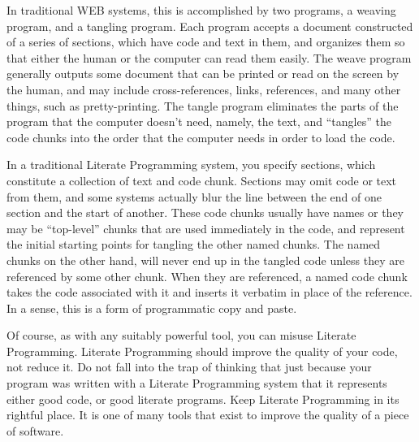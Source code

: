 In traditional WEB systems, this is accomplished by two programs, a
weaving program, and a tangling program.  Each program accepts a
document constructed of a series of sections, which have code and text
in them, and organizes them so that either the human or the computer
can read them easily.  The weave program generally outputs some
document that can be printed or read on the screen by the human, and
may include cross-references, links, references, and many other
things, such as pretty-printing.  The tangle program eliminates the
parts of the program that the computer doesn't need, namely, the text,
and ``tangles'' the code chunks into the order that the computer needs
in order to load the code.

In a traditional Literate Programming system, you specify sections,
which constitute a collection of text and code chunk.  Sections may
omit code or text from them, and some systems actually blur the line
between the end of one section and the start of another.  These code
chunks usually have names or they may be ``top-level'' chunks that are
used immediately in the code, and represent the initial starting
points for tangling the other named chunks.  The named chunks on the
other hand, will never end up in the tangled code unless they are
referenced by some other chunk.  When they are referenced, a named
code chunk takes the code associated with it and inserts it verbatim
in place of the reference.  In a sense, this is a form of programmatic
copy and paste.

Of course, as with any suitably powerful tool, you can misuse Literate
Programming.  Literate Programming should improve the quality of your
code, not reduce it.  Do not fall into the trap of thinking that just
because your program was written with a Literate Programming system
that it represents either good code, or good literate programs.  Keep
Literate Programming in its rightful place.  It is one of many tools
that exist to improve the quality of a piece of software.


